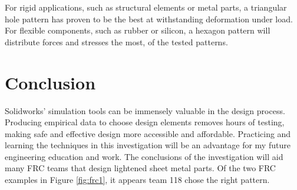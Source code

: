 \documentclass[12pt, letterpaper]{article}
\begin{document}
For rigid applications, such as structural elements or metal parts, a triangular hole pattern has proven to be the best at withstanding deformation under load. For flexible components, such as rubber or silicon, a hexagon pattern will distribute forces and stresses the most, of the tested patterns. 

\section{Conclusion}
\label{sec:conclusion}

Solidworks' simulation tools can be immensely valuable in the design process. Producing empirical data to choose design elements removes hours of testing, making safe and effective design more accessible and affordable. Practicing and learning the techniques in this investigation will be an advantage for my future engineering education and work. The conclusions of the investigation will aid many FRC teams that design lightened sheet metal parts. Of the two FRC examples in Figure \ref{fig:frc1}, it appears team 118 chose the right pattern. 

\newpage
\printbibliography{}

\newpage
\appendix
{}
\appendixpage
\addappheadtotoc
\listoffigures
\end{document}
